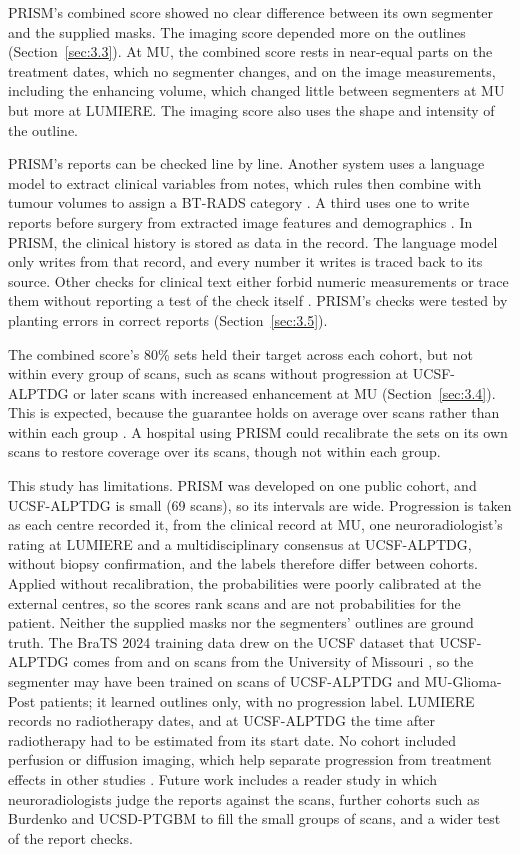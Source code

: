 \documentclass[largeformat]{interact} %
\begin{document}
PRISM's combined score showed no clear difference between its own segmenter and the supplied masks. The imaging score depended
more on the outlines (Section~\ref{sec:3.3}). At MU, the combined score rests in near-equal parts on the treatment dates, which no
segmenter changes, and on the image measurements, including the enhancing volume, which changed little between
segmenters at MU but more at LUMIERE. The imaging score also uses the shape and intensity of the outline. 

PRISM's reports can be checked line by line. Another system uses a language model to extract clinical variables from
notes, which rules then combine with tumour volumes to assign a BT-RADS category \citep{jabal2026}. A third uses one
to write reports before surgery from extracted image features and demographics \citep{herasrivera2026}. In PRISM, the clinical history is stored as
data in the record. The language model only writes from that record, and every number it writes is traced back to its
source. Other checks for clinical text either forbid numeric measurements \citep{pham2026} or trace them without reporting a test
of the check itself \citep{mansour2026}. PRISM's checks were tested by planting errors in correct reports
(Section~\ref{sec:3.5}).

The combined score's 80\% sets held their target across each cohort, but not within every group of scans, such as
scans without progression at UCSF-ALPTDG or later scans with increased enhancement at MU (Section~\ref{sec:3.4}). This is expected, because the guarantee holds on average over scans rather than within each group
\citep{barber2021limits,mehrtens2023}. A hospital using PRISM could recalibrate the sets
on its own scans to restore coverage over its scans, though not within each group.

This study has limitations. PRISM was developed on one public cohort, and UCSF-ALPTDG is small (69 scans),
so its intervals are wide. Progression is taken as each centre recorded it, from the clinical record at MU, one neuroradiologist's
rating at LUMIERE and a multidisciplinary consensus at UCSF-ALPTDG, without biopsy confirmation, and the labels
therefore differ between cohorts. Applied without recalibration, the probabilities were poorly calibrated at the
external centres, so the scores rank scans and are not probabilities for the patient. Neither the supplied masks nor the segmenters' outlines are ground truth. The BraTS 2024 training data drew on the UCSF dataset that
UCSF-ALPTDG comes from and on scans from the University of Missouri \citep{deverdier2024}, so the segmenter may have
been trained on scans of UCSF-ALPTDG and MU-Glioma-Post patients; it learned outlines only, with no progression label. LUMIERE records no radiotherapy dates, and at UCSF-ALPTDG the time after radiotherapy had to be estimated from its
start date. No cohort
included perfusion or diffusion imaging, which help separate progression from treatment effects in other studies
\citep{taylor2022}. Future work includes a reader study in which neuroradiologists judge the reports against the
scans, further cohorts such as Burdenko \citep{zolotova2023burdenko} and UCSD-PTGBM \citep{gagnon2026} to fill the
small groups of scans, and a wider test of the report checks.
\end{document}
